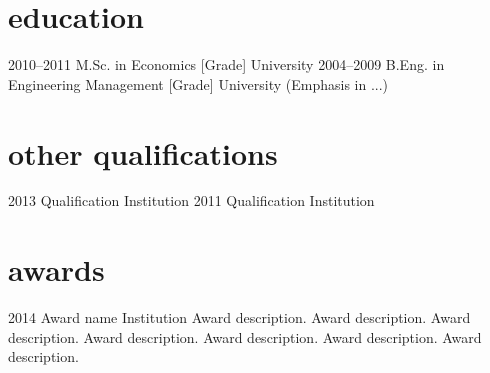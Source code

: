 \documentclass[]{cv-style}          %
\begin{document}
\section{education}

\begin{entrylist}
\entry
{2010--2011}
{M.Sc. {\normalfont in Economics [Grade]}}
{University}
{\vspace{-0.3cm}}
\entry
{2004--2009}
{B.Eng. {\normalfont in Engineering Management [Grade]}}
{University}
{(Emphasis in ...)}
\end{entrylist}


\section{other qualifications}

\begin{entrylist}
\entry
{2013}
{Qualification}
{Institution}
{\vspace{-0.3cm}}
\entry
{2011}
{Qualification}
{Institution}
{\vspace{-0.3cm}}
\end{entrylist}


\section{awards}

\begin{entrylist}
\entry
{2014}
{Award name}
{Institution}
{Award description. Award description. Award description. Award description. Award description. Award description. Award description. }
\end{entrylist}
\end{document}
